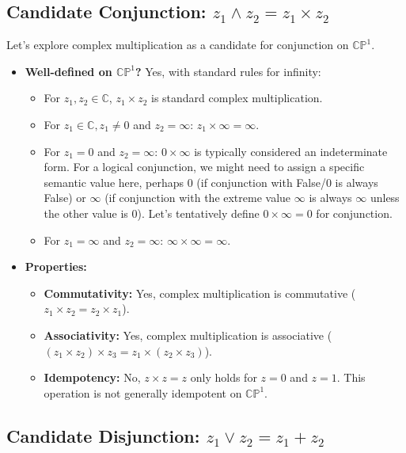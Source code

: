 	\subsection{Candidate Conjunction: $z_1 \wedge z_2 = z_1 \times z_2$}
	
	Let's explore complex multiplication as a candidate for conjunction on $\mathbb{CP}^1$.
	
	\begin{itemize}
		\item \textbf{Well-defined on $\mathbb{CP}^1$?} Yes, with standard rules for infinity:
		\begin{itemize}
			\item For $z_1, z_2 \in \mathbb{C}$, $z_1 \times z_2$ is standard complex multiplication.
			\item For $z_1 \in \mathbb{C}, z_1 \neq 0$ and $z_2 = \infty$: $z_1 \times \infty = \infty$.
			\item For $z_1 = 0$ and $z_2 = \infty$: $0 \times \infty$ is typically considered an indeterminate form. For a logical conjunction, we might need to assign a specific semantic value here, perhaps 0 (if conjunction with False/0 is always False) or $\infty$ (if conjunction with the extreme value $\infty$ is always $\infty$ unless the other value is 0). Let's tentatively define $0 \times \infty = 0$ for conjunction.
			\item For $z_1 = \infty$ and $z_2 = \infty$: $\infty \times \infty = \infty$.
		\end{itemize}
		
		\item \textbf{Properties:}
		\begin{itemize}
			\item \textbf{Commutativity:} Yes, complex multiplication is commutative ($z_1 \times z_2 = z_2 \times z_1$).
			\item \textbf{Associativity:} Yes, complex multiplication is associative ($(z_1 \times z_2) \times z_3 = z_1 \times (z_2 \times z_3)$).
			\item \textbf{Idempotency:} No, $z \times z = z$ only holds for $z = 0$ and $z = 1$. This operation is not generally idempotent on $\mathbb{CP}^1$.
		\end{itemize}
	\end{itemize}
	
	\subsection{Candidate Disjunction: $z_1 \vee z_2 = z_1 + z_2$}
	
